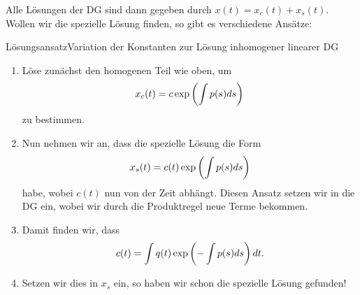 Alle Lösungen der DG sind dann gegeben durch $x(t)=x_c(t)+x_s(t)$.\\
Wollen wir die spezielle Lösung finden, so gibt es verschiedene Ansätze:
\begin{Satz}
{Lösungsansatz}{Variation der Konstanten zur Lösung inhomogener linearer DG}
\begin{enumerate}
    \item Löse zunächst den homogenen Teil wie oben, um
    \begin{equation*}
        x_c(t)=c\exp\left({\int p(s)ds}\right)
    \end{equation*}
    zu bestimmen.
    \item Nun nehmen wir an, dass die spezielle Lösung die Form
    \begin{equation*}
        x_s(t)=c(t)\exp\left({\int p(s)ds}\right)
    \end{equation*}
    habe, wobei $c(t)$ nun von der Zeit abhängt. Diesen Ansatz setzen wir in die DG ein, wobei wir durch die Produktregel neue Terme bekommen.
    \item Damit finden wir, dass
    \begin{equation*}
        c(t)=\int q(t)\exp\left({-\int p(s)ds}\right)dt.
    \end{equation*}
    \item Setzen wir dies in $x_s$ ein, so haben wir schon die spezielle Lösung gefunden!
\end{enumerate}
\end{Satz}

